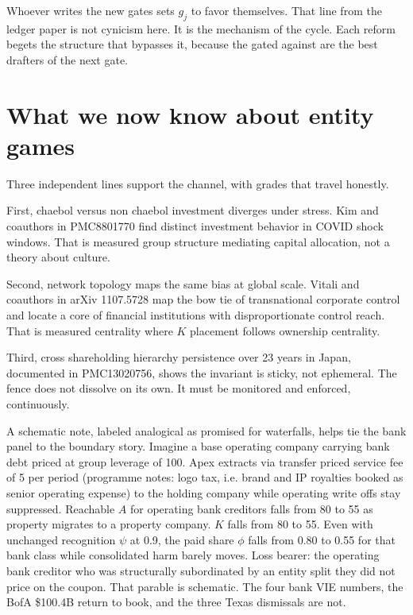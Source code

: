 Whoever writes the new gates sets $g_j$ to favor themselves. That line from the ledger paper is not cynicism here. It is the mechanism of the cycle. Each reform begets the structure that bypasses it, because the gated against are the best drafters of the next gate.

\section{What we now know about entity games}

Three independent lines support the channel, with grades that travel honestly.

First, chaebol versus non chaebol investment diverges under stress. Kim and coauthors in PMC8801770 find distinct investment behavior in COVID shock windows. That is measured group structure mediating capital allocation, not a theory about culture.

Second, network topology maps the same bias at global scale. Vitali and coauthors in arXiv 1107.5728 map the bow tie of transnational corporate control and locate a core of financial institutions with disproportionate control reach. That is measured centrality where $K$ placement follows ownership centrality.

Third, cross shareholding hierarchy persistence over 23 years in Japan, documented in PMC13020756, shows the invariant is sticky, not ephemeral. The fence does not dissolve on its own. It must be monitored and enforced, continuously.

A schematic note, labeled analogical as promised for waterfalls, helps tie the bank panel to the boundary story. Imagine a base operating company carrying bank debt priced at group leverage of 100. Apex extracts via transfer priced service fee of 5 per period (programme notes: logo tax, i.e. brand and IP royalties booked as senior operating expense) to the holding company while operating write offs stay suppressed. Reachable $A$ for operating bank creditors falls from 80 to 55 as property migrates to a property company. $K$ falls from 80 to 55. Even with unchanged recognition $\psi$ at 0.9, the paid share $\phi$ falls from 0.80 to 0.55 for that bank class while consolidated harm barely moves. Loss bearer: the operating bank creditor who was structurally subordinated by an entity split they did not price on the coupon. That parable is schematic. The four bank VIE numbers, the BofA \$100.4B return to book, and the three Texas dismissals are not.

